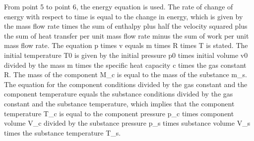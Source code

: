 From point 5 to point 6, the energy equation is used. The rate of change of energy with respect to time is equal to the change in energy, which is given by the mass flow rate times the sum of enthalpy plus half the velocity squared plus the sum of heat transfer per unit mass flow rate minus the sum of work per unit mass flow rate. The equation p times v equals m times R times T is stated. The initial temperature T0 is given by the initial pressure p0 times initial volume v0 divided by the mass m times the specific heat capacity c times the gas constant R. The mass of the component M_c is equal to the mass of the substance m_s. The equation for the component conditions divided by the gas constant and the component temperature equals the substance conditions divided by the gas constant and the substance temperature, which implies that the component temperature T_c is equal to the component pressure p_c times component volume V_c divided by the substance pressure p_s times substance volume V_s times the substance temperature T_s.